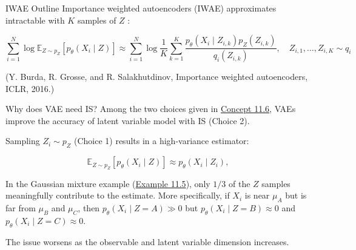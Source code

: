 \begin{frame}[allowframebreaks]

\begin{myconceptblock}{11.7}{IWAE Outline}
    Importance weighted autoencoders (IWAE) approximates intractable with $K$ samples of $Z$ :

    $$
    \sum_{i=1}^{N} \log \mathbb{E}_{Z \sim p_{Z}}\left[p_{\theta}\left(X_{i} \mid Z\right)\right] \approx \sum_{i=1}^{N} \log \frac{1}{K} \sum_{k=1}^{K} \frac{p_{\theta}\left(X_{i} \mid Z_{i, k}\right) p_{Z}\left(Z_{i, k}\right)}{q_{i}\left(Z_{i, k}\right)}, \quad Z_{i, 1}, \ldots, Z_{i, K} \sim q_{i}
    $$

    (Y. Burda, R. Grosse, and R. Salakhutdinov, Importance weighted autoencoders, ICLR, 2016.)
\end{myconceptblock}

\end{frame}

\begin{frame}[allowframebreaks]

\begin{myconceptblock}{11.8}{Why does VAE need IS?}
    Among the two choices given in \hyperref[concept:11.6]{Concept 11.6}, VAEs improve the accuracy of latent variable model with IS (Choice 2).

    Sampling $Z_{i} \sim p_{Z}$ (Choice 1) results in a high-variance estimator:

    $$
    \mathbb{E}_{Z \sim p_{Z}}\left[p_{\theta}\left(X_{i} \mid Z\right)\right] \approx p_{\theta}\left(X_{i} \mid Z_{i}\right),
    $$

    In the Gaussian mixture example (\hyperref[example:11.5]{Example 11.5}), only $1 / 3$ of the $Z$ samples meaningfully contribute to the estimate. More specifically, if $X_{i}$ is near $\mu_{A}$ but is far from $\mu_{B}$ and $\mu_{C}$, then $p_{\theta}\left(X_{i} \mid Z=A\right) \gg 0$ but $p_{\theta}\left(X_{i} \mid Z=B\right) \approx 0$ and $p_{\theta}\left(X_{i} \mid Z=C\right) \approx 0$.

    The issue worsens as the observable and latent variable dimension increases.
\end{myconceptblock}

\end{frame}


\begin{frame}[allowframebreaks]

\par\noindent\textcolor{gray}{\hdashrule{\textwidth}{0.4pt}{1pt 2pt}}

\end{frame}


